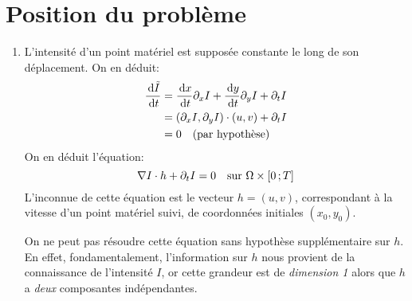 \section{Position du problème}

\begin{enumerate}[label=\fbox{\textbf{Q\arabic*}}, series=questions]
\item L'intensité d'un point matériel est supposée constante le long de son déplacement. On en déduit:
\begin{align*}
  \dfrac{\, \mathrm{d} \tilde{I}}{\, \mathrm{d} t} &= \dfrac{\, \mathrm{d} x}{\, \mathrm{d} t} \partial_x I + \dfrac{\, \mathrm{d} y}{\, \mathrm{d} t} \partial_y I + \partial_t I \\
                             &= (\partial_x I, \partial_y I) \cdot (u, v) + \partial_t I \\
                             &= 0 \quad\text{(par hypothèse)}
\end{align*}
On en déduit l'équation:
\begin{equation}
  \label{eq:general}
  \nabla I \cdot h + \partial_t I = 0 \quad \text{sur } \Omega \times \interff{0}{T}
\end{equation}
L'inconnue de cette équation est le vecteur $h = (u,v)$, correspondant à la vitesse d'un point matériel suivi, de coordonnées initiales $(x_0, y_0)$. 

On ne peut pas résoudre cette équation sans hypothèse supplémentaire sur $h$. En effet, fondamentalement, l'information sur $h$ nous provient de la connaissance de l'intensité $I$, or cette grandeur est \og{}de \emph{dimension 1}\fg{} alors que $h$ a \emph{deux} composantes indépendantes.
\end{enumerate}